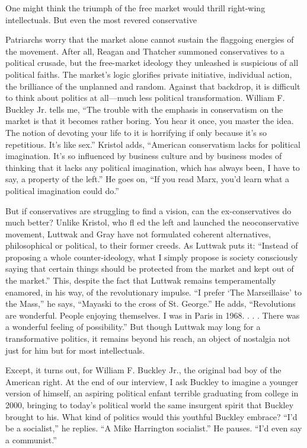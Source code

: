  \par 
One might think the triumph of the free market would thrill right-wing intellectuals. But even the most revered conservative
 \par 
Patriarchs worry that the market alone cannot sustain the flaggoing energies of the movement. After all, Reagan and Thatcher summoned conservatives to a political crusade, but the free-market ideology they unleashed is suspicious of all political faiths. The market’s logic glorifies private initiative, individual action, the brilliance of the unplanned and random. Against that backdrop, it is difficult to think about politics at all—much less political transformation. William F. Buckley Jr. tells me, “The trouble with the emphasis in conservatism on the market is that it becomes rather boring. You hear it once, you master the idea. The notion of devoting your life to it is horrifying if only because it’s so repetitious. It’s like sex.” Kristol adds, “American conservatism lacks for political imagination. It’s so influenced by business culture and by business modes of thinking that it lacks any political imagination, which has always been, I have to say, a property of the left.” He goes on, “If you read Marx, you’d learn what a political imagination could do.”
 \par 
But if conservatives are struggling to find a vision, can the ex-conservatives do much better? Unlike Kristol, who fl ed the left and launched the neoconservative movement, Luttwak and Gray have not formulated coherent alternatives, philosophical or political, to their former creeds. As Luttwak puts it: “Instead of proposing a whole counter-ideology, what I simply propose is society consciously saying that certain things should be protected from the market and kept out of the market.” This, despite the fact that Luttwak remains temperamentally enamored, in his way, of the revolutionary impulse. “I prefer ‘The Marseillaise’ to the Mass,” he says, “Mayaski to the cross of St. George.” He adds, “Revolutions are wonderful. People enjoying themselves. I was in Paris in 1968. . . . There was a wonderful feeling of possibility.” But though Luttwak may long for a transformative politics, it remains beyond his reach, an object of nostalgia not just for him but for most intellectuals.
 \par 
Except, it turns out, for William F. Buckley Jr., the original bad boy of the American right. At the end of our interview, I ask Buckley to imagine a younger version of himself, an aspiring political enfant terrible graduating from college in 2000, bringing to today’s political world the same insurgent spirit that Buckley brought to his. What kind of politics would this youthful Buckley embrace? “I’d be a socialist,” he replies. “A Mike Harrington socialist.” He pauses. “I’d even say a communist.”
